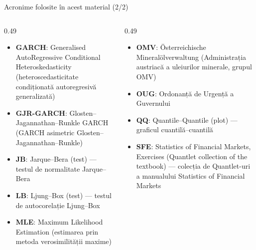 \begin{frame}{Acronime folosite în acest material (2/2)}
\begin{columns}[T]
\begin{column}{0.49\textwidth}
\begin{itemize}\setlength{\itemsep}{0pt}
    \item \textbf{GARCH}: Generalised AutoRegressive Conditional Heteroskedasticity (heteroscedasticitate condiționată autoregresivă generalizată)
    \item \textbf{GJR-GARCH}: Glosten–Jagannathan–Runkle GARCH (GARCH asimetric Glosten–Jagannathan–Runkle)
    \item \textbf{JB}: Jarque–Bera (test) — testul de normalitate Jarque–Bera
    \item \textbf{LB}: Ljung–Box (test) — testul de autocorelație Ljung–Box
    \item \textbf{MLE}: Maximum Likelihood Estimation (estimarea prin metoda verosimilității maxime)
\end{itemize}
\end{column}
\begin{column}{0.49\textwidth}
\begin{itemize}\setlength{\itemsep}{0pt}
    \item \textbf{OMV}: Österreichische Mineralölverwaltung (Administrația austriacă a uleiurilor minerale, grupul OMV)
    \item \textbf{OUG}: Ordonanță de Urgență a Guvernului
    \item \textbf{QQ}: Quantile–Quantile (plot) — graficul cuantilă–cuantilă
    \item \textbf{SFE}: Statistics of Financial Markets, Exercises (Quantlet collection of the textbook) — colecția de Quantlet-uri a manualului Statistics of Financial Markets
\end{itemize}
\end{column}
\end{columns}
\end{frame}

